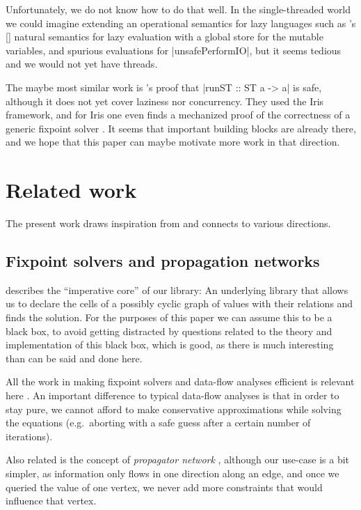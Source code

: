 \documentclass[manuscript,anonymous,screen,acmsmall]{acmart}
\begin{document}
Unfortunately, we do not know how to do that well. In the single-threaded world we could imagine extending an operational semantics for lazy languages such as \citeauthor{launchbury}’s [\citeyear{launchbury}] natural semantics for lazy evaluation with a global store for the mutable variables, and spurious evaluations for |unsafePerformIO|, but it seems tedious and we would not yet have threads.

The maybe most similar work is \citeauthor{runST}'s \citeyear{runST} proof that |runST :: ST a -> a| is safe, although it does not yet cover laziness nor concurrency.
They used the Iris framework, and for Iris one even finds a mechanized proof of the correctness of a generic fixpoint solver \citep{spygame}.
It seems that important building blocks are already there, and we hope that this paper can maybe motivate more work in that direction.


\section{Related work}\label{sec:related}

The present work draws inspiration from and connects to various directions.

\subsection{Fixpoint solvers and propagation networks}

 describes the “imperative core” of our library: An underlying library that allows us to declare the cells of a possibly cyclic graph of values with their relations and finds the solution. For the purposes of this paper we can assume this to be a black box, to avoid getting distracted by questions related to the theory and implementation of this black box, which is good, as there is much interesting than can be said and done here.

All the work in making fixpoint solvers and data-flow analyses efficient is relevant here \citep{kildall-73,kam-ullman-76}. An important difference to typical data-flow analyses is that in order to stay pure, we cannot afford to make conservative approximations while solving the equations (e.g.\ aborting with a safe guess after a certain number of iterations).

Also related is the concept of \emph{propagator network} \citep{propagator}, although our use-case is a bit simpler, as information only flows in one direction along an edge, and once we queried the value of one vertex, we never add more constraints that would influence that vertex.
\end{document}
